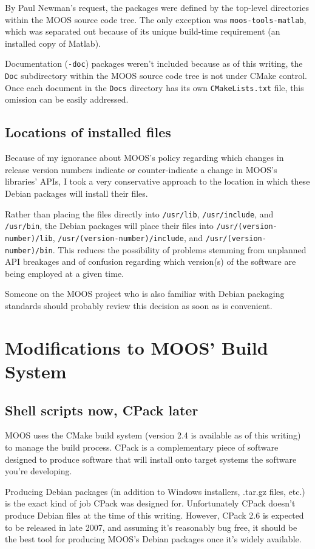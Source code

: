 \documentclass[letterpaper,10pt]{article}
\begin{document}
By Paul Newman's request, the packages were defined by the top-level directories
within the MOOS source code tree.  The only exception was 
\verb|moos-tools-matlab|, which was separated out because of its unique
build-time requirement (an installed copy of Matlab).

Documentation (\verb|-doc|) packages weren't included because as of this 
writing, the \verb|Doc| subdirectory within the MOOS source code tree is not
under CMake control.  Once each document in the \verb|Docs| directory has its own
\verb|CMakeLists.txt| file, this omission can be easily addressed.

\subsection{Locations of installed files}
Because of my ignorance about MOOS's policy regarding which changes in 
release version numbers indicate or counter-indicate a change in MOOS's
libraries' APIs, I took a very conservative approach to the location in
which these Debian packages will install their files.

Rather than placing the files directly into \verb|/usr/lib|, \verb|/usr/include|, 
and \verb|/usr/bin|, the Debian packages will place their files into 
\verb|/usr/(version-number)/lib|, \verb|/usr/(version-number)/include|, 
and \verb|/usr/(version-number)/bin|.
This reduces the possibility of problems stemming from unplanned API breakages
and of confusion regarding which version(s) of the software are being employed
at a given time.

Someone on the MOOS project who is also familiar with Debian packaging 
standards should probably review this decision as soon as is convenient.

\section{Modifications to MOOS' Build System}
\subsection{Shell scripts now, CPack later}
MOOS uses the CMake build system (version 2.4 is available as of this writing)
to manage the build process.  CPack is a complementary piece of software designed
to produce software that will install onto target systems the software you're
developing.  

Producing Debian packages (in addition to Windows installers, .tar.gz files, 
etc.) is the exact kind of job CPack was designed for.  Unfortunately CPack
doesn't produce Debian files at the time of this writing.  However, CPack 2.6
is expected to be released in late 2007, and assuming it's reasonably bug
free, it should be the best tool for producing MOOS's Debian packages once
it's widely available.
\end{document}
